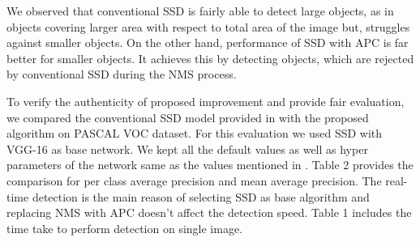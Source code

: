 \documentclass[conference]{IEEEtran}
\begin{document}
We observed that conventional SSD is fairly able to detect large objects, as in objects covering larger area with respect to total area of the image but, struggles against smaller objects. On the other hand, performance of SSD with APC is far better for smaller objects. It achieves this by detecting objects, which are rejected by conventional SSD during the NMS process. 



To verify the authenticity of proposed improvement and provide fair evaluation, we compared the conventional SSD model provided in \cite{DBLP:journals/corr/LiuAESR15} with the proposed algorithm on PASCAL VOC dataset. For this evaluation we used SSD with VGG-16 as base network. We kept all the default values as well as hyper parameters of the network same as the values mentioned in \cite{DBLP:journals/corr/LiuAESR15}. Table 2 provides the comparison for per class average precision and mean average precision. The real-time detection is the main reason of selecting SSD as base algorithm and replacing NMS with APC doesn't affect the detection speed. Table 1 includes the time take to perform detection on single image. 
\end{document}

